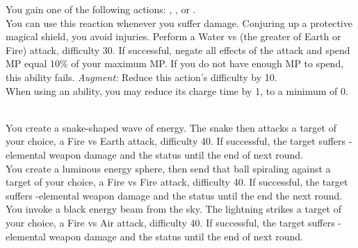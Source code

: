 \begin{tabjob}
         You gain one of the following actions: , , or . \\

         You can use this reaction whenever you suffer damage. Conjuring up a protective magical shield, you avoid injuries. Perform a Water vs (the greater of Earth or Fire) attack, difficulty 30. If successful, negate all effects of the attack and spend MP equal 10\% of your maximum MP\@. If you do not have enough MP to spend, this ability fails. \textit{Augment:} Reduce this action's difficulty by 10. \\

         When using an ability, you may reduce its charge time by 1, to a minimum of 0. \\

    \tabjobsep%

    \\

         You create a snake-shaped wave of energy. The snake then attacks a target of your choice, a Fire vs Earth attack, difficulty 40. If successful, the target suffers -elemental weapon damage and the  status until the end of next round. \\
      
         You create a luminous energy sphere, then send that ball spiraling against a target of your choice, a Fire vs Fire attack, difficulty 40. If successful, the target suffers -elemental weapon damage and the  status until the end the next round. \\

         You invoke a black energy beam from the sky. The lightning strikes a target of your choice, a Fire vs Air attack, difficulty 40. If successful, the target suffers -elemental weapon damage and the  status until the end of next round. \\

    \tabjobspec{}%


\end{tabjob}

